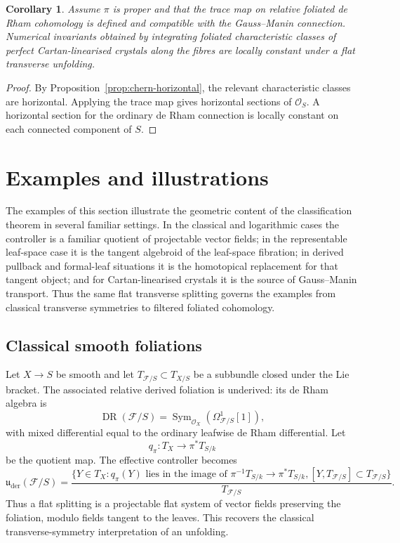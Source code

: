 \documentclass[11pt,reqno,a4paper,dvipsnames,x11names]{amsart}
\numberwithin{equation}{section}
\theoremstyle{plain}
\newtheorem{corollary}[theorem]{Corollary}
\theoremstyle{definition}
\theoremstyle{remark}
\newcommand{\cO}{\mathcal{O}}
\DeclareMathOperator{\Sym}{Sym}
\DeclareMathOperator{\DR}{DR}
\newcommand{\kk}{k}
\newcommand{\cF}{\mathcal F}
\newcommand{\uuder}{\mathfrak u_{\mathrm{der}}}
\newcommand{\from}{\colon}
\begin{document}
\begin{corollary}
Assume \(\pi\) is proper and that the trace map on relative foliated de Rham cohomology is defined and compatible with the Gauss--Manin connection. Numerical invariants obtained by integrating foliated characteristic classes of perfect Cartan-linearised crystals along the fibres are locally constant under a flat transverse unfolding.
\end{corollary}

\begin{proof}
By Proposition~\ref{prop:chern-horizontal}, the relevant characteristic classes are horizontal. Applying the trace map gives horizontal sections of \(\cO_S\). A horizontal section for the ordinary de Rham connection is locally constant on each connected component of \(S\).
\end{proof}

\section{Examples and illustrations}\label{sec:examples}

The examples of this section illustrate the geometric content of the classification theorem in several familiar settings. In the classical and logarithmic cases the controller is a familiar quotient of projectable vector fields; in the representable leaf-space case it is the tangent algebroid of the leaf-space fibration; in derived pullback and formal-leaf situations it is the homotopical replacement for that tangent object; and for Cartan-linearised crystals it is the source of Gauss--Manin transport. Thus the same flat transverse splitting governs the examples from classical transverse symmetries to filtered foliated cohomology.

\subsection{Classical smooth foliations}

Let \(X\to S\) be smooth and let \(T_{\cF/S}\subset T_{X/S}\) be a subbundle closed under the Lie bracket. The associated relative derived foliation is underived: its de Rham algebra is
\[
 \DR(\cF/S)=\Sym_{\cO_X}(\Omega^1_{\cF/S}[1]),
\]
with mixed differential equal to the ordinary leafwise de Rham differential. Let
\[
 q_\pi\from T_X\longrightarrow \pi^*T_{S/\kk}
\]
be the quotient map. The effective controller becomes
\[
 \uuder(\cF/S)=
 \frac{
 \{Y\in T_X:
 q_\pi(Y)\text{ lies in the image of }\pi^{-1}T_{S/\kk}\to\pi^*T_{S/\kk},
 [Y,T_{\cF/S}]\subset T_{\cF/S}\}
 }{T_{\cF/S}} .
\]
Thus a flat splitting is a projectable flat system of vector fields preserving the foliation, modulo fields tangent to the leaves. This recovers the classical transverse-symmetry interpretation of an unfolding.
\end{document}
